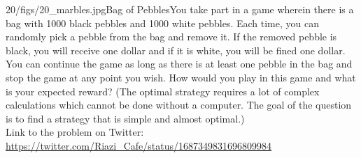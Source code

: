 \begin{problem}{20/figs/20_marbles.jpg}{Bag of Pebbles}You take part in a game wherein there is a bag with 1000 black pebbles and 1000 white pebbles. Each time, you can randomly pick a pebble from the bag and remove it. If the removed pebble is black, you will receive one dollar and if it is white, you will be fined one dollar. You can continue the game as long as there is at least one pebble in the bag and stop the game at any point you wish. How would you play in this game and what is your expected reward? (The optimal strategy requires a lot of complex calculations which cannot be done without a computer. The goal of the question is to find a strategy that is simple and almost optimal.)\\[0.2cm]

Link to the problem on Twitter:  \url{https://twitter.com/Riazi_Cafe/status/1687349831696809984}\end{problem}